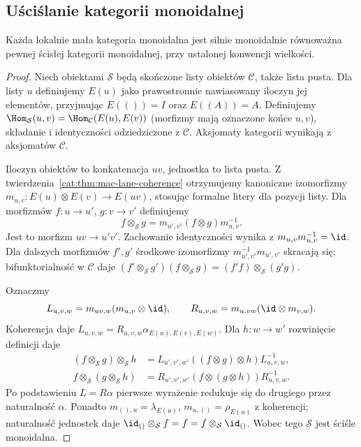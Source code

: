 \subsection{Uściślanie kategorii monoidalnej}
\begin{twierdzenie}\label{cat:thm:strictification}
Każda lokalnie mała kategoria monoidalna jest silnie monoidalnie równoważna pewnej ścisłej kategorii monoidalnej, przy ustalonej konwencji wielkości.
\end{twierdzenie}
\begin{proof}
Niech obiektami $\mathcal S$ będą skończone listy obiektów $\mathcal C$, także lista pusta. Dla listy $u$ definiujemy $E(u)$ jako prawostronnie nawiasowany iloczyn jej elementów, przyjmując $E(())=I$ oraz $E((A))=A$. Definiujemy $\Hom_{\mathcal S}(u,v)=\Hom_{\mathcal C}(E(u),E(v))$ (morfizmy mają oznaczone końce $u,v$), składanie i identyczności odziedziczone z $\mathcal C$. Aksjomaty kategorii wynikają z aksjomatów $\mathcal C$.

Iloczyn obiektów to konkatenacja $uv$, jednostka to lista pusta. Z twierdzenia~\ref{cat:thm:mac-lane-coherence} otrzymujemy kanoniczne izomorfizmy $m_{u,v}:E(u)\otimes E(v)\to E(uv)$, stosując formalne litery dla pozycji listy. Dla morfizmów $f:u\to u'$, $g:v\to v'$ definiujemy
\[
f\otimes_{\mathcal S}g=m_{u',v'}(f\otimes g)m_{u,v}^{-1}.
\]
Jest to morfizm $uv\to u'v'$. Zachowanie identyczności wynika z $m_{u,v}m_{u,v}^{-1}=\id$. Dla dalszych morfizmów $f',g'$ środkowe izomorfizmy $m_{u',v'}^{-1}m_{u',v'}$ skracają się; bifunktorialność w $\mathcal C$ daje $(f'\otimes_{\mathcal S}g')(f\otimes_{\mathcal S}g)=(f'f)\otimes_{\mathcal S}(g'g)$.

Oznaczmy
\[
L_{u,v,w}=m_{uv,w}(m_{u,v}\otimes\id),\qquad
R_{u,v,w}=m_{u,vw}(\id\otimes m_{v,w}).
\]
Koherencja daje $L_{u,v,w}=R_{u,v,w}\alpha_{E(u),E(v),E(w)}$. Dla $h:w\to w'$ rozwinięcie definicji daje
\[
\begin{aligned}
(f\otimes_{\mathcal S}g)\otimes_{\mathcal S}h
&=L_{u',v',w'}((f\otimes g)\otimes h)L_{u,v,w}^{-1},\\
f\otimes_{\mathcal S}(g\otimes_{\mathcal S}h)
&=R_{u',v',w'}(f\otimes(g\otimes h))R_{u,v,w}^{-1}.
\end{aligned}
\]
Po podstawieniu $L=R\alpha$ pierwsze wyrażenie redukuje się do drugiego przez naturalność $\alpha$. Ponadto $m_{(),u}=\lambda_{E(u)}$, $m_{u,()}=\rho_{E(u)}$ z koherencji; naturalność jednostek daje $\id_{()}\otimes_{\mathcal S}f=f=f\otimes_{\mathcal S}\id_{()}$. Wobec tego $\mathcal S$ jest ściśle monoidalna.


\end{proof}
